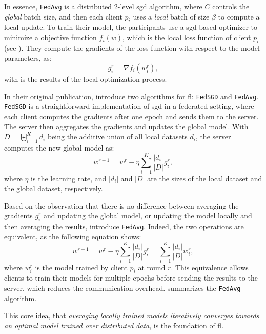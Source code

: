 In essence, \texttt{FedAvg} is a distributed 2-level \gls{sgd} algorithm, where $C$ controls the \emph{global} batch size, and then each client $p_i$ uses a \emph{local} batch of size $\beta$ to compute a local update.
To train their model, the participants use a \gls{sgd}-based optimizer to minimize a objective function $f_i(w)$, which is the local loss function of client $p_i$ (see ).
They compute the gradients of the loss function with respect to the model parameters, as:
\begin{equation}
  g_i^r = \nabla f_i(w_i^r),
\end{equation}
with is the results of the local optimization process.

In their original publication, \textcite{mcmahan_Communicationefficientlearningdeep_2017} introduce two algorithms for \gls{fl}: \texttt{FedSGD} and \texttt{FedAvg}.
\texttt{FedSGD} is a straightforward implementation of \gls{sgd} in a federated setting, where each client computes the gradients after one epoch and sends them to the server.
The server then aggregates the gradients and updates the global model.
With $D=\biguplus_{i=1}^K d_i$ being the additive union of all local datasets $d_i$, the server computes the new global model as:
\begin{equation}
  w^{r+1} = w^r - \eta \sum_{i=1}^{K} \frac{|d_i|}{|D|} g_i^r,
\end{equation}
where $\eta$ is the learning rate, and $|d_i|$ and $|D|$ are the sizes of the local dataset and the global dataset, respectively.

Based on the observation that there is no difference between averaging the gradients $g_i^r$ and updating the global model, or updating the model locally and then averaging the results, \textcite{mcmahan_Communicationefficientlearningdeep_2017} introduce \texttt{FedAvg}.
Indeed, the two operations are equivalent, as the following equation shows:
\begin{equation}
  w^{r+1} = w^r - \eta \sum_{i=1}^{K} \frac{|d_i|}{|D|} g_i^r = \sum_{i=1}^{K} \frac{|d_i|}{|D|} w_i^r,
\end{equation}
where $w_i^r$ is the model trained by client $p_i$ at round $r$.
This equivalence allows clients to train their models for multiple epochs before sending the results to the server, which reduces the communication overhead.
 summarizes the \texttt{FedAvg} algorithm.

This core idea, that \emph{averaging locally trained models iteratively converges towards an optimal model trained over distributed data}, is the foundation of \gls{fl}.

